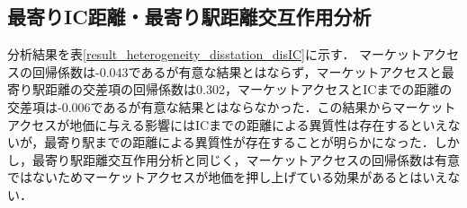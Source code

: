 \subsection{最寄りIC距離・最寄り駅距離交互作用分析}
分析結果を表\ref{result_heterogeneity_disstation_disIC}に示す．
マーケットアクセスの回帰係数は-0.043であるが有意な結果とはならず，マーケットアクセスと最寄り駅距離の交差項の回帰係数は0.302，マーケットアクセスとICまでの距離の交差項は-0.006であるが有意な結果とはならなかった．この結果からマーケットアクセスが地価に与える影響にはICまでの距離による異質性は存在するといえないが，最寄り駅までの距離による異質性が存在することが明らかになった．しかし，最寄り駅距離交互作用分析と同じく，マーケットアクセスの回帰係数は有意ではないためマーケットアクセスが地価を押し上げている効果があるとはいえない．

